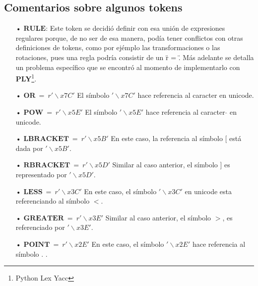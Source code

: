 \subsection{Comentarios sobre algunos tokens}
\begin{itemize}
\item[•] $\mathbf{RULE}$: Este token se decidi\'o definir con esa uni\'on de expresiones regulares porque, de no ser de esa manera, pod\'ia tener conflictos con otras definiciones de tokens, como por ej\'emplo las transformaciones o las rotaciones, pues una regla podr\'ia consistir de un \" r = \". M\'as adelante se detalla un problema espec\'ifico que se encontr\'o al momento de implementarlo con \textbf{PLY}\footnote{Python Lex Yacc}. 

\item[•] $\mathbf{OR}\ =\ r'\backslash x7C'$ El s\'imbolo $'\backslash x7C'$ hace referencia al caracter  \textbar   en unicode.
\item[•] $\mathbf{POW}\ =\ r'\backslash x5E'$ El s\'imbolo $'\backslash x5E'$ hace referencia al caracter $ \widehat{} $  en unicode.
\item[•] $\mathbf{LBRACKET}\ =\ r'\backslash x5B'$ En este caso, la referencia al s\'imbolo [ est\'a dada por $'\backslash x5B'$. 
\item[•] $\mathbf{RBRACKET}\ =\ r'\backslash x5D'$ Similar al caso anterior, el s\'imbolo ] es representado por $'\backslash x5D'$.
\item[•] $\mathbf{LESS}\ =\ r'\backslash x3C'$ En este caso, el s\'imbolo $'\backslash x3C'$ en unicode esta referenciando al s\'imbolo $ < $. 
\item[•] $\mathbf{GREATER}\ =\ r'\backslash x3E'$ Similar al caso anterior, el s\'imbolo $ > $, es referenciado por $'\backslash x3E'$.
\item[•] $\mathbf{POINT}\ =\ r'\backslash x2E'$ En este caso, el s\'imbolo $'\backslash x2E'$ hace referencia al s\'imbolo .  .

\end{itemize}
